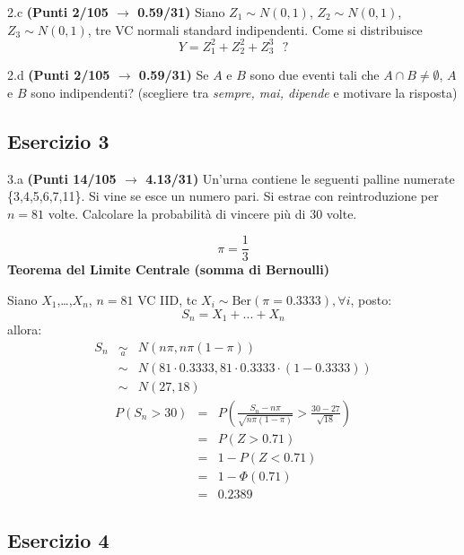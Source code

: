 \documentclass[
  11pt,
]{book}
\theoremstyle{mytheoremstyle}
\theoremstyle{mydefstyle}
\newenvironment{sol}
  {
  \begin{tcolorbox}[enhanced,breakable,arc=0.1mm,boxrule=1pt,colback=white,colframe=iblue,
  title=\bf \fontfamily{lmss}\selectfont \hspace{.5 cm} Soluzione,drop fuzzy shadow]

}{
\end{tcolorbox}
  }
\begin{document}
2.c \textbf{(Punti 2/105 \(\rightarrow\) 0.59/31)} Siano \(Z_1\sim N(0,1)\), \(Z_2\sim N(0,1)\), \(Z_3\sim N(0,1)\), tre VC normali standard indipendenti.
Come si distribuisce
\[
Y=Z_1^2+Z_2^2+Z_3^3~~~?
\]

2.d \textbf{(Punti 2/105 \(\rightarrow\) 0.59/31)} Se \(A\) e \(B\) sono due eventi tali che \(A\cap B\ne\emptyset\), \(A\) e \(B\) sono indipendenti? (scegliere tra \emph{sempre, mai, dipende} e motivare la risposta)

\subsection{Esercizio 3}\label{esercizio-3-31}

3.a \textbf{(Punti 14/105 \(\rightarrow\) 4.13/31)} Un'urna contiene le seguenti palline numerate \{3,4,5,6,7,11\}. Si vine se esce un numero pari. Si estrae con reintroduzione per \(n=81\) volte.
Calcolare la probabilità di vincere più di 30 volte.

\begin{sol}
\[\pi=\frac 13\]
\textbf{Teorema del Limite Centrale (somma di Bernoulli)}

Siano \(X_1\),\ldots,\(X_n\), \(n=81\) VC IID, tc \(X_i\sim\text{Ber}(\pi=0.3333)\)\(,\forall i\), posto:
\[
      S_n = X_1 + ... + X_n
      \]
allora:\begin{eqnarray*}
  S_n & \mathop{\sim}\limits_{a}& N(n\pi,n\pi(1-\pi)) \\
      &\sim & N(81\cdot0.3333,81\cdot0.3333\cdot(1-0.3333)) \\
      &\sim & N(27,18)
  \end{eqnarray*}\begin{eqnarray*}
      P( S_n   >   30 ) 
        &=& P\left(  \frac { S_n  -  n\pi }{ \sqrt{n\pi(1-\pi)} }  >  \frac { 30  -  27 }{\sqrt{ 18 }} \right)  \\
                 &=& P\left(  Z   >   0.71 \right) \\    &=& 1-P(Z< 0.71 )\\ 
                 &=&  1-\Phi( 0.71 ) \\ &=&  0.2389 
      \end{eqnarray*}

\end{sol}

\subsection{Esercizio 4}\label{esercizio-4-31}
\end{document}
